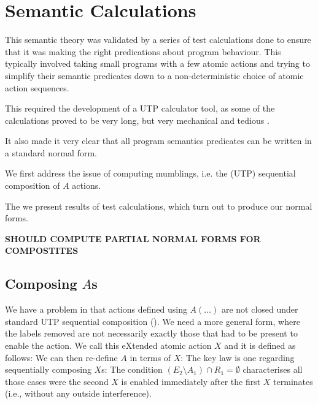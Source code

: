 \section{Semantic Calculations}\label{sec:calc}

This semantic theory was validated by a series of test calculations
done to ensure that it was making the right predications about program behaviour.
This typically involved taking small programs with a few atomic actions
and trying to simplify their semantic predicates
down to a non-deterministic choice of atomic action sequences.

This required the development of a UTP calculator tool,
as some of the calculations proved to be very long,
but very mechanical and tedious \cite{conf/utp/Butterfield16}.

It also made it very clear that all program semantics predicates can be written
in a standard normal form.

We first address the issue of computing mumblings, i.e. the (UTP)
sequential composition of $A$ actions.

The we present results of test calculations,
which turn out to produce our normal forms.

\textbf{SHOULD COMPUTE PARTIAL NORMAL FORMS
FOR COMPOSTITES}

\subsection{Composing $A$s}\label{ssec:comp-A}

We have a problem in that actions defined using $A(\dots)$
are not closed under standard UTP sequential composition ().
We need a more general form,
where the labels removed are not necessarily
exactly those that had to be present to enable the action.
We call this eXtended atomic action $X$ and it is defined as follows:
We can then re-define $A$ in terms of $X$:
The key law is one regarding sequentially composing $X$s:
The condition $(E_2\setminus A_1) \cap R_1 = \emptyset$
characterises all those cases were the second $X$ is enabled
immediately after the first $X$ terminates
(i.e., without any outside interference).

